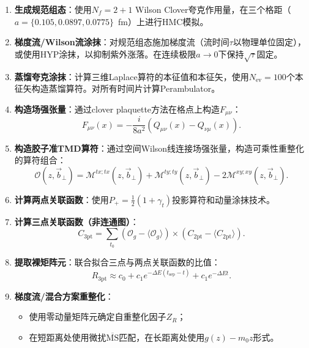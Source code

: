 \documentclass[12pt,a4paper]{ctexart}
\theoremstyle{definition}
\newcommand{\MS}{\overline{\text{MS}}}
\newcommand{\tsep}{t_{\text{sep}}}
\begin{document}
\begin{enumerate}[label=\textbf{步骤 \arabic*}:, leftmargin=*]
    \item \textbf{生成规范组态}：使用$N_f = 2+1$ Wilson Clover夸克作用量，在三个格距（$a = \{0.105, 0.0897, 0.0775\}$~fm）上进行HMC模拟。

    \item \textbf{梯度流/Wilson流涂抹}：对规范组态施加梯度流（流时间$\tau$以物理单位固定），或使用HYP涂抹，以抑制紫外涨落。在连续极限$a \to 0$下保持$\sqrt{\tau}$固定。

    \item \textbf{蒸馏夸克涂抹}：计算三维Laplace算符的本征值和本征矢，使用$N_{\text{ev}} = 100$个本征矢构造蒸馏算符。对所有时间片计算Perambulator。

    \item \textbf{构造场强张量}：通过clover plaquette方法在格点上构造$F_{\mu\nu}$：
    \begin{equation}
        F_{\mu\nu}(x) = -\frac{i}{8a^2} (Q_{\mu\nu}(x) - Q_{\nu\mu}(x)).
    \end{equation}

    \item \textbf{构造胶子准TMD算符}：通过空间Wilson线连接场强张量，构造可乘性重整化的算符组合：
    \begin{equation}
        \mathcal{O}(z, \vec{b}_\perp) = \mathcal{M}^{tx;tx}(z, \vec{b}_\perp) + \mathcal{M}^{ty;ty}(z, \vec{b}_\perp) - 2\mathcal{M}^{xy;xy}(z, \vec{b}_\perp).
    \end{equation}

    \item \textbf{计算两点关联函数}：使用$P_+ = \frac{1}{2}(1+\gamma_t)$投影算符和动量涂抹技术。

    \item \textbf{计算三点关联函数（非连通图）}：
    \begin{equation}
        C_{3\text{pt}} = \sum_{t_0} (\mathcal{O}_g - \langle \mathcal{O}_g \rangle) \times (C_{2\text{pt}} - \langle C_{2\text{pt}} \rangle).
    \end{equation}

    \item \textbf{提取裸矩阵元}：联合拟合三点与两点关联函数的比值：
    \begin{equation}
        R_{3\text{pt}} \approx c_0 + c_1 e^{-\Delta E(\tsep - t)} + c_1 e^{-\Delta E t}.
    \end{equation}

    \item \textbf{梯度流/混合方案重整化}：
    \begin{itemize}
        \item 使用零动量矩阵元确定自重整化因子$Z_R$；
        \item 在短距离处使用微扰$\MS$匹配，在长距离处使用$g(z) - m_0 z$形式。
    \end{itemize}


\end{enumerate}
\end{document}
